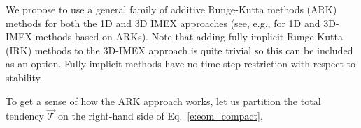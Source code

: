 \documentclass{article}
\begin{document}
We propose to use a general family of additive Runge-Kutta methods (ARK) methods for both the 1D and 3D IMEX approaches (see, e.g., \citet{giraldo:2013} for 1D and 3D-IMEX methods based on ARKs). Note that adding fully-implicit Runge-Kutta (IRK) methods to the 3D-IMEX approach is quite trivial so this can be included as an option. Fully-implicit methods have no time-step restriction with respect to stability.

To get a sense of how the ARK approach works, let us partition the total tendency 
$\vec{\mathcal{T}}$ on the right-hand side of Eq.~\eqref{e:eom_compact}, 

\end{document}
